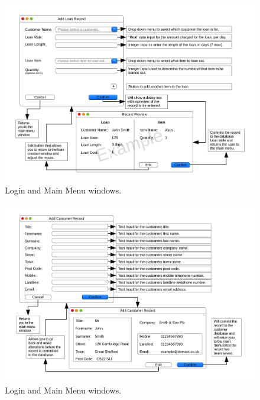 \begin{landscape}
\newpage

\begin{figure}[H]
    \begin{center}
        \includegraphics[width=500px]{./Design/user_interface/Add_loan_record_interface.pdf}
    \end{center}
    \caption{Login and Main Menu windows.} \label{fig:print_function_result}
\end{figure}

\newpage

\begin{figure}[H]
    \begin{center}
        \includegraphics[width=500px]{./Design/user_interface/Add_customer_record_interface.pdf}
    \end{center}
    \caption{Login and Main Menu windows.} \label{fig:print_function_result}
\end{figure}


\end{landscape}
